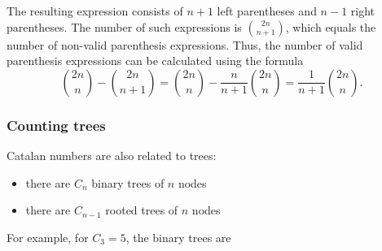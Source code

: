 The resulting expression consists of $n+1$
left parentheses and $n-1$ right parentheses.
The number of such expressions is $\binom{2n}{n+1}$,
which equals the number of non-valid
parenthesis expressions.
Thus, the number of valid parenthesis
expressions can be calculated using the formula
\[\binom{2n}{n}-\binom{2n}{n+1} = \binom{2n}{n} - \frac{n}{n+1} \binom{2n}{n} = \frac{1}{n+1} \binom{2n}{n}.\]

\subsubsection{Counting trees}

Catalan numbers are also related to trees:

\begin{itemize}
    \item there are $C_n$ binary trees of $n$ nodes
    \item there are $C_{n-1}$ rooted trees of $n$ nodes
\end{itemize}
\noindent
For example, for $C_3=5$, the binary trees are

